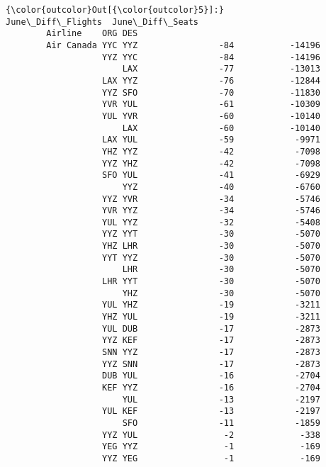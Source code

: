 \documentclass[11pt]{article}
\begin{document}
\begin{Verbatim}[commandchars=\\\{\}]
{\color{outcolor}Out[{\color{outcolor}5}]:}                     June\_Diff\_Flights  June\_Diff\_Seats
        Airline    ORG DES                                    
        Air Canada YYC YYZ                -84           -14196
                   YYZ YYC                -84           -14196
                       LAX                -77           -13013
                   LAX YYZ                -76           -12844
                   YYZ SFO                -70           -11830
                   YVR YUL                -61           -10309
                   YUL YVR                -60           -10140
                       LAX                -60           -10140
                   LAX YUL                -59            -9971
                   YHZ YYZ                -42            -7098
                   YYZ YHZ                -42            -7098
                   SFO YUL                -41            -6929
                       YYZ                -40            -6760
                   YYZ YVR                -34            -5746
                   YVR YYZ                -34            -5746
                   YUL YYZ                -32            -5408
                   YYZ YYT                -30            -5070
                   YHZ LHR                -30            -5070
                   YYT YYZ                -30            -5070
                       LHR                -30            -5070
                   LHR YYT                -30            -5070
                       YHZ                -30            -5070
                   YUL YHZ                -19            -3211
                   YHZ YUL                -19            -3211
                   YUL DUB                -17            -2873
                   YYZ KEF                -17            -2873
                   SNN YYZ                -17            -2873
                   YYZ SNN                -17            -2873
                   DUB YUL                -16            -2704
                   KEF YYZ                -16            -2704
                       YUL                -13            -2197
                   YUL KEF                -13            -2197
                       SFO                -11            -1859
                   YYZ YUL                 -2             -338
                   YEG YYZ                 -1             -169
                   YYZ YEG                 -1             -169
\end{Verbatim}
            
\end{document}
